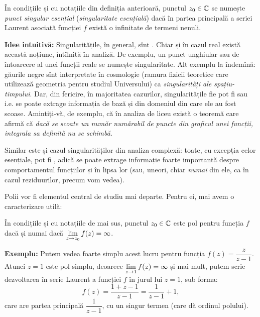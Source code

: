 \begin{definition}\label{def:sing-es}
  În condițiile și cu notațiile din definiția anterioară, punctul $ z_0 \in \mathbb{C} $
  se numește \emph{punct singular esențial} (\emph{singularitate esențială})
  dacă în partea principală a seriei Laurent asociată funcției $ f $ există o
  infinitate de termeni nenuli.
\end{definition}

\vspace{0.3cm}

\textbf{Idee intuitivă:} Singularitățile, în general, sînt .
Chiar și în cazul real există această noțiune, întîlnită în analiză. De exemplu,
un punct unghiular sau de întoarcere al unei funcții reale se numește singularitate.
Alt exemplu la îndemînă: găurile negre sînt interpretate în cosmologie (ramura fizicii
teoretice care utilizează geometria pentru studiul  Universului) ca
\emph{singularități ale spațiu-timpului}. Dar, din fericire, în majoritatea cazurilor,
singularitățile fie pot fi  sau  i.e. se poate extrage
informația de bază și din domeniul din care ele au fost scoase. Amintiți-vă, de exemplu,
că în analiza de liceu există o teoremă care afirmă că \emph{dacă se scoate un număr numărabil %
  de puncte din graficul unei funcții, integrala sa definită nu se schimbă}.

Similar este și cazul singularităților din analiza complexă: toate, cu excepția
celor esențiale, pot fi , adică se poate extrage informație
foarte importantă despre comportamentul funcțiilor și în lipsa lor (sau, uneori,
chiar \emph{numai} din ele, ca în cazul reziduurilor, precum vom vedea).

\vspace{0.3cm}

Polii vor fi elementul central de studiu mai departe. Pentru ei, mai avem
o caracterizare utilă:

\begin{proposition}\label{pr:pol}
  În condițiile și cu notațiile de mai sus, punctul $ z_0 \in \mathbb{C} $ este pol pentru
  funcția $ f $ dacă și numai dacă $ \displaystyle\lim_{z \to z_0} f(z) = \infty $.
\end{proposition}

\textbf{Exemplu:} Putem vedea foarte simplu acest lucru pentru funcția
$ f(z) = \dfrac{z}{z - 1} $. Atunci $ z = 1 $ este pol simplu, deoarece
$ \displaystyle\lim_{z \to 1} f(z) = \infty $ și mai mult, putem scrie dezvoltarea
în serie Laurent a funcției $ f $ în jurul lui $ z = 1 $, sub forma:
\[
  f(z) = \dfrac{1 + z - 1}{z - 1} = \dfrac{1}{z - 1} + 1,
\]
care are partea principală $ \dfrac{1}{z - 1} $, cu un singur termen
(care dă ordinul polului).

